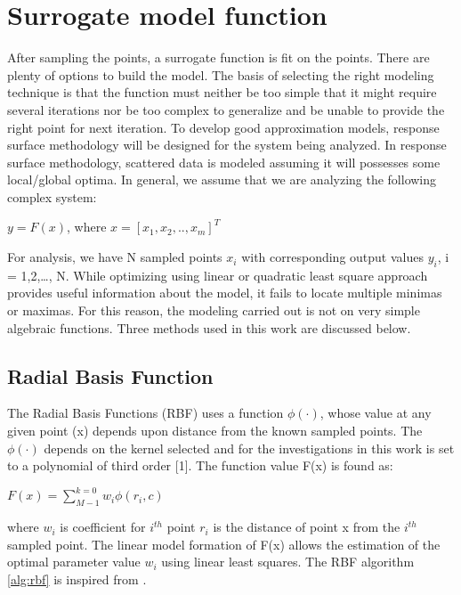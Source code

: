 \section{Surrogate model function}
After sampling the points, a surrogate function is fit on the points. There are plenty of options to build the model. The basis of selecting the right modeling technique is that the function must neither be too simple that it might require several iterations nor be too complex to generalize and be unable to provide the right point for next iteration.
\bigskip
\noindent
To develop good approximation models, response surface methodology will be designed for the system being analyzed. In response surface methodology, scattered data is modeled assuming it will possesses some local/global optima. In general, we assume that we are analyzing the following complex system:
\begin{center}
$y=F(x)$,
where $x=[x_{1}, x_{2}, .., x_{m}]^{T}$    
\end{center}
\noindent
For analysis, we have N sampled points $x_{i}$ with corresponding output values $y_{i}$, i = 1,2,…, N. While optimizing using linear or quadratic least square approach provides useful information about the model, it fails to locate multiple minimas or maximas. For this reason, the modeling carried out is not on very simple algebraic functions. Three methods used in this work are discussed below.

\subsection{Radial Basis Function}
The Radial Basis Functions (RBF) uses a function $\phi(\cdot)$, whose value at any given point (x) depends upon distance from the known sampled points. The $\phi(\cdot)$ depends on the kernel selected and for the investigations in this work is set to a polynomial of third order [1]. The function value F(x) is found as:  

\begin{center}
    $F(x) = \displaystyle \sum_{M-1}^{k=0} w_i\phi(r_i, c)$
\end{center}

where $w_i$ is coefficient for $i^{th}$ point $r_i$ is the distance of point x from the $i^{th}$ sampled point. The linear model formation of F(x) allows the estimation of the optimal parameter value $w_i$ using linear least squares. The RBF algorithm \ref{alg:rbf} is inspired from \cite{Mller2013}.



